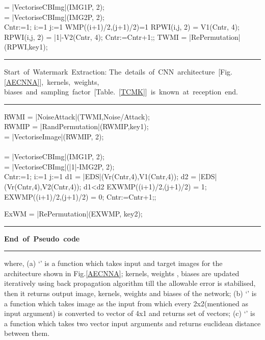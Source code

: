 \begin{spacing}{1.2}
{\begin{program}
  	 	[V1] = |VectoriseCBImg|(IMG1P, 2);\\
  	 	[V2] = |VectoriseCBImg|(IMG2P, 2);\\
  	 	Cntr:=1;
  	 \FOR i:=1    \DO
  	 	\FOR j:=1    \DO
  	 		 \IF WMP((i+1)/2,(j+1)/2)=1
  	 		 \THEN 
  	 			 RPWI(i,j, 2) = V1(Cntr, 4);
  	 			\ELSE	
  	 			 RPWI(i,j, 2) = |1|-V2(Cntr, 4);	
  	 			 \FI
  	 		Cntr:=Cntr+1;;	
  	 	\END
  	 \END
  	 TWMI = |RePermutation|(RPWI,key1);
  \rule{\linewidth}{0.4pt}
  	\mbox{Start of Watermark Extraction:} 
  	 \mbox{The details of CNN architecture [Fig.\ref{AECNNA}], kernels, weights, }
  	 \mbox{biases and sampling factor [Table. \ref{TCMK}] is known at reception end.}
  	\rule{\linewidth}{0.4pt}
  	RWMI = |NoiseAttack|(TWMI,Noise/Attack);\\
  	RWMIP = |RandPermutation|(RWMIP,key1);\\
  	[Vr] = |VectoriseImage|(RWMIP, 2);\\
  	 \\
  	[V1] = |VectoriseCBImg|(IMG1P, 2);\\
  	[V2] = |VectoriseCBImg|(|1|-IMG2P, 2);\\
	
	Cntr:=1;
  	 \FOR i:=1    \DO
  	 	\FOR j:=1    \DO
  	 	d1 = |EDS|(Vr(Cntr,4),V1(Cntr,4));
  	 	d2 = |EDS|(Vr(Cntr,4),V2(Cntr,4));
  	 		 \IF d1<d2
  	 		 \THEN 
  	 			EXWMP((i+1)/2,(j+1)/2) = 1;
  	 			\ELSE	
  	 			 EXWMP((i+1)/2,(j+1)/2) = 0;
  	 			 \FI
  	 		Cntr:=Cntr+1;;	
  	 	\END
  	 \END  	 
  	 
  	 ExWM = |RePermutation|(EXWMP, key2);
    
\END

\end{program}  
}
\end{spacing} 
\noindent\rule{\linewidth}{1pt}

\mbox{\bf End of Pseudo code}

\noindent\rule{\linewidth}{1pt}
 
   where, (a) `' is a function which takes input and target images for the architecture shown in Fig.\ref{AECNNA}; kernels, weights , biases are updated iteratively using back propagation algorithm till the allowable error is stabilised, then it returns output image, kernels, weights and biases of the network; (b) `' is a function which takes image as the input from which every 2x2(mentioned as input argument) is converted to vector of 4x1 and returns set of vectors; (c) `' is a function which takes two vector input arguments and returns euclidean distance between them.\\
 
